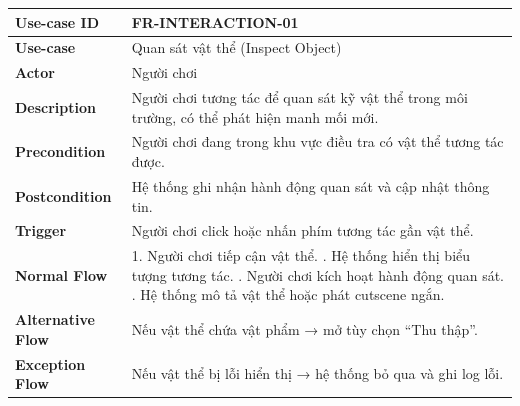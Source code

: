 \begin{table}[H]
\centering
\begin{tabular}{|p{4cm}|p{10cm}|}
\hline
\textbf{Use-case ID} & FR-INTERACTION-01 \\ \hline
\textbf{Use-case} & Quan sát vật thể (Inspect Object) \\ \hline
\textbf{Actor} & Người chơi \\ \hline
\textbf{Description} & Người chơi tương tác để quan sát kỹ vật thể trong môi trường, có thể phát hiện manh mối mới. \\ \hline
\textbf{Precondition} & Người chơi đang trong khu vực điều tra có vật thể tương tác được. \\ \hline
\textbf{Postcondition} & Hệ thống ghi nhận hành động quan sát và cập nhật thông tin. \\ \hline
\textbf{Trigger} & Người chơi click hoặc nhấn phím tương tác gần vật thể. \\ \hline
\textbf{Normal Flow} &
1. Người chơi tiếp cận vật thể. \newline
2. Hệ thống hiển thị biểu tượng tương tác. \newline
3. Người chơi kích hoạt hành động quan sát. \newline
4. Hệ thống mô tả vật thể hoặc phát cutscene ngắn. \\ \hline
\textbf{Alternative Flow} &
Nếu vật thể chứa vật phẩm → mở tùy chọn “Thu thập”. \\ \hline
\textbf{Exception Flow} &
Nếu vật thể bị lỗi hiển thị → hệ thống bỏ qua và ghi log lỗi. \\ \hline
\end{tabular}
\end{table}


